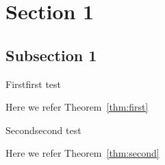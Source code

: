 \documentclass{article}
\begin{document}
\section{Section 1}

\subsection{Subsection 1}
\begin{Theorem}{First}{first}
test
\end{Theorem}

Here we refer Theorem~\ref{thm:first}
\begin{Theorem}{Second}{second}
test
\end{Theorem}
Here we refer Theorem~\ref{thm:second}
\end{document}
